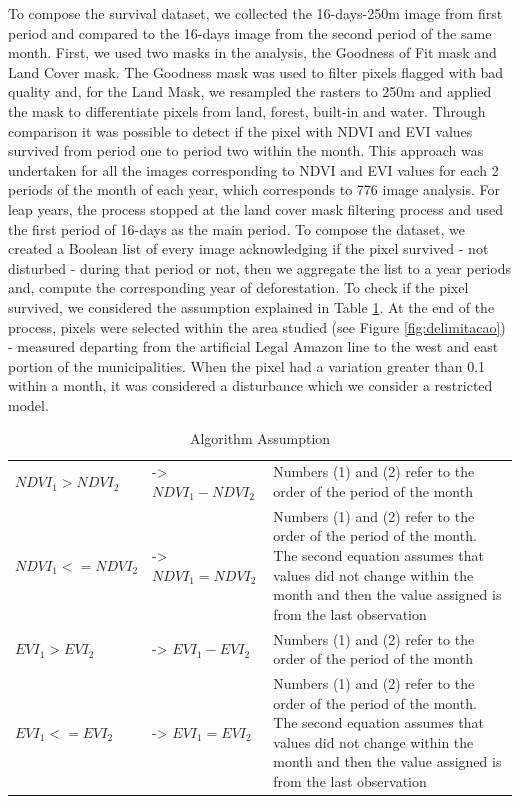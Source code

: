 To compose the survival dataset, we collected the 16-days-250m image from first period and compared to the 16-days image from the second period of the same month. First, we used two masks in the analysis, the Goodness of Fit mask and Land Cover mask. The Goodness mask was used to filter pixels flagged with bad quality and, for the Land Mask, we resampled the rasters to 250m and applied the mask to differentiate pixels from land, forest, built-in and water. Through comparison it was possible to detect if the pixel with NDVI and EVI values survived from period one to period two within the month. This approach was undertaken for all the images corresponding to NDVI and EVI values for each 2 periods of the month of each year, which corresponds to 776 image analysis. For leap years, the process stopped at the land cover mask filtering process and used the first period of 16-days as the main period. To compose the dataset, we created a Boolean list of every image acknowledging if the pixel survived - not disturbed - during that period or not, then we aggregate the list to a year periods and, compute the corresponding year of deforestation. To check if the pixel survived, we considered the assumption explained in Table \ref{assumption}. At the end of the process, pixels were selected within the area studied (see Figure \ref{fig:delimitacao}) - measured departing from the artificial Legal Amazon line to the west and east portion of the municipalities. When the pixel had a variation greater than 0.1 within a month, it was considered a disturbance which we consider a restricted model.

\begin{table}[H]
\footnotesize
\caption{Algorithm Assumption}
\begin{tabularx}{\linewidth}{X X X}
\hline
\hline
$NDVI_{1} > NDVI_{2}$	& ->  $NDVI_{1} - NDVI_{2}$	 & Numbers (1) and (2) refer to the order of the period of the month \\
$NDVI_{1} <= NDVI_{2}$	& ->  $NDVI_{1} = NDVI_{2}$	 & Numbers (1) and (2) refer to the order of the period of the month. The second equation assumes that values did not change within the month and then the value assigned is from the last observation	\\
\hline
$EVI_{1} > EVI_{2}$	& ->  $EVI_{1} - EVI_{2}$	 & Numbers (1) and (2) refer to the order of the period of the month \\
$EVI_{1} <= EVI_{2}$	& ->  $EVI_{1} = EVI_{2}$	 & Numbers (1) and (2) refer to the order of the period of the month. The second equation assumes that values did not change within the month and then the value assigned is from the last observation 	\\
\hline
\hline
\end{tabularx}
\label{assumption}
\end{table}

